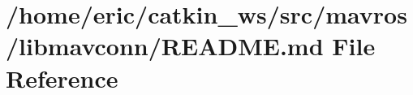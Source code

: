 \hypertarget{mavros_2libmavconn_2README_8md}{}\section{/home/eric/catkin\+\_\+ws/src/mavros/libmavconn/\+R\+E\+A\+D\+ME.md File Reference}
\label{mavros_2libmavconn_2README_8md}
